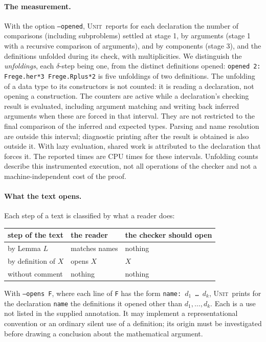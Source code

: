 \documentclass[11pt]{article}
\newcommand{\sys}{\textsc{Unit}}
\newcommand{\kw}[1]{\texttt{#1}}
\begin{document}
\paragraph{The measurement.} With the option \kw{--opened}, \sys\ reports
for each declaration the number of comparisons (including subproblems)
settled at stage 1, by arguments (stage 1 with a recursive comparison of
arguments), and by components (stage 3), and the definitions unfolded
during its check, with multiplicities. We distinguish the
\emph{unfoldings}, each $\delta$-step being one, from the distinct
definitions opened: \kw{opened 2: Frege.her*3 Frege.Rplus*2} is five unfoldings of
two definitions. The unfolding of a data type to
its constructors is not counted: it is reading a declaration, not
opening a construction. The counters are active while a declaration's
checking result is evaluated, including argument matching and writing
back inferred arguments when these are forced in that interval. They
are not restricted to the final comparison of the inferred and expected
types. Parsing and name resolution are outside this interval; diagnostic
printing after the result is obtained is also outside it. With lazy
evaluation, shared work is attributed to the declaration that forces it.
The reported times are CPU times for these intervals. Unfolding counts
describe this instrumented execution, not all operations of the checker
and not a machine-independent cost of the proof.

\paragraph{What the text opens.} Each step of a text is classified by what a reader does:
\begin{center}
\begin{tabular}{lll}
\toprule
step of the text & the reader & the checker should open\\
\midrule
by Lemma $L$ & matches names & nothing\\
by definition of $X$ & opens $X$ & $X$\\
without comment & nothing & nothing\\
\bottomrule
\end{tabular}
\end{center}
With \kw{--opens F}, where each line of \kw{F} has the form
\kw{name: $d_1$ \dots\ $d_k$}, \sys\ prints for the declaration
\kw{name} the definitions it opened other than $d_1,\dots,d_k$. Each is
a use not listed in the supplied annotation. It may implement a
representational convention or an ordinary silent use of a definition;
its origin must be investigated before drawing a conclusion about the
mathematical argument.
\end{document}

